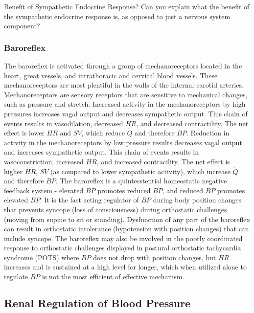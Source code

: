 \begin{question}{Benefit of Sympathetic Endocrine Response?}
    Can you explain what the benefit of the sympathetic endocrine response is, as opposed to just a nervous system component?
\end{question}

\subsubsection{Baroreflex}

The baroreflex is activated through a group of mechanoreceptors located in the heart, great vessels, and intrathoracic and cervical blood vessels. These mechanoreceptors are most plentiful in the walls of the internal carotid arteries. Mechanoreceptors are sensory receptors that are sensitive to mechanical changes, such as pressure and stretch. Increased activity in the mechanoreceptors by high pressures increases vagal output and decreases sympathetic output. This chain of events results in vasodilation, decreased $HR$, and decreased contractility. The net effect is lower $HR$ and $SV$, which reduce $\dot{Q}$ and therefore $BP$. Reduction in activity in the mechanoreceptors by low pressure results decreases vagal output and increases sympathetic output. This chain of events results in vasoconstriction, increased $HR$, and increased contracility. The net effect is higher $HR$,  $SV$ (as compared to lower sympathetic activity), which increase $\dot{Q}$ and therefore $BP$. The baroreflex is a quintesstential homeostatic negative feedback system - elevated $BP$ promotes reduced $BP$, and reduced $BP$ promotes elevated $BP$. It is the fast acting regulator of $BP$ during body position changes that prevents syncope (loss of consciousness) during orthostatic challenges  (moving from supine to sit or standing).
Dysfunction of any part of the baroreflex can result in orthostatic intolerance (hypotension with position changes) that can include syncope. The baroreflex may also be involved in the poorly coordinated response to orthostatic challenges displayed in postural orthostatic tachycardia syndrome (POTS) where $BP$ does not drop with position changes, but $HR$ increases and is sustained at a high level for longer, which when utilized alone to regulate $BP$ is not the most efficient of effective mechanism.  

\subsection{Renal Regulation of Blood Pressure}

